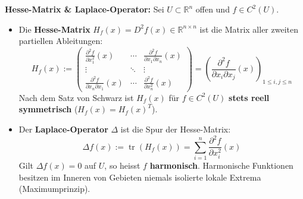 \begin{definition}
    \textbf{Hesse-Matrix \& Laplace-Operator:} Sei $U \subset \mathbb{R}^n$ offen und $f \in C^2(U)$.
    \begin{itemize}
        \item Die \textbf{Hesse-Matrix} $H_f(x) = D^2 f(x) \in \mathbb{R}^{n \times n}$ ist die Matrix aller zweiten partiellen Ableitungen:
        $$ H_f(x) := \begin{pmatrix}
            \frac{\partial^2 f}{\partial x_1^2}(x) & \cdots & \frac{\partial^2 f}{\partial x_1 \partial x_n}(x) \\
            \vdots & \ddots & \vdots \\
            \frac{\partial^2 f}{\partial x_n \partial x_1}(x) & \cdots & \frac{\partial^2 f}{\partial x_n^2}(x)
        \end{pmatrix} = \left( \frac{\partial^2 f}{\partial x_i \partial x_j}(x) \right)_{1 \le i, j \le n} $$
        Nach dem Satz von Schwarz ist $H_f(x)$ für $f \in C^2(U)$ \textbf{stets reell symmetrisch} ($H_f(x) = H_f(x)^T$).
        \item Der \textbf{Laplace-Operator} $\Delta$ ist die Spur der Hesse-Matrix:
        $$ \Delta f(x) := \operatorname{tr}(H_f(x)) = \sum_{i=1}^n \frac{\partial^2 f}{\partial x_i^2}(x) $$
        Gilt $\Delta f(x) = 0$ auf $U$, so heisst $f$ \textbf{harmonisch}. Harmonische Funktionen besitzen im Inneren von Gebieten niemals isolierte lokale Extrema (Maximumprinzip).
    \end{itemize}
\end{definition}

